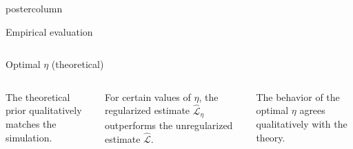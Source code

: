 \documentclass[final,hyperref={pdfpagelabels=false}]{beamer}
\begin{document}
\begin{frame}
\begin{columns}
\begin{column}{.49\textwidth}
\begin{beamercolorbox}[center,wd=\textwidth]{postercolumn}
\begin{minipage}[T]{.95\textwidth}
{\begin{block}{Empirical evaluation}
\begin{columns}
\begin{column}{.25\textwidth}
\begin{center}
  {\tiny Optimal $\eta$ (theoretical)}
    \vspace{-0.5em}
    \vspace{1em}
  \end{center}

   \end{column}
   \end{columns}

   \begin{columns}
   \begin{column}{.25\textwidth}
    The theoretical prior qualitatively matches the simulation. 
   \end{column}

   \begin{column}{.40\textwidth}
  For certain values of $\eta$, the regularized estimate $\mathcal{\hat
  L}_\eta$ outperforms the unregularized estimate $\mathcal{\hat L}$.
    \vfill
   \end{column}

   \begin{column}{.25\textwidth}
   The behavior of the optimal $\eta$ agrees qualitatively with the theory.
    \vfill
   \end{column}


\end{columns}
\end{block}}
\end{minipage}
\end{beamercolorbox}
\end{column}
\end{columns}
\end{frame}
\end{document}
